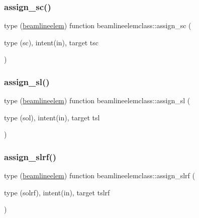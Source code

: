 \mbox{\label{namespacebeamlineelemclass_a1e66e5399a7d4fc6fcfba7e3877f8d2e}} 
\subsubsection{\texorpdfstring{assign\_sc()}{assign\_sc()}}
{\footnotesize\ttfamily type (\mbox{\hyperlink{namespacebeamlineelemclass_structbeamlineelemclass_1_1beamlineelem}{beamlineelem}}) function beamlineelemclass\+::assign\+\_\+sc (\begin{DoxyParamCaption}\item[{type (sc), intent(in), target}]{tsc }\end{DoxyParamCaption})}

\mbox{\label{namespacebeamlineelemclass_ad06dd33f09db1eab5304ec2a865a4b83}} 
\subsubsection{\texorpdfstring{assign\_sl()}{assign\_sl()}}
{\footnotesize\ttfamily type (\mbox{\hyperlink{namespacebeamlineelemclass_structbeamlineelemclass_1_1beamlineelem}{beamlineelem}}) function beamlineelemclass\+::assign\+\_\+sl (\begin{DoxyParamCaption}\item[{type (sol), intent(in), target}]{tsl }\end{DoxyParamCaption})}

\mbox{\label{namespacebeamlineelemclass_a2ab33d7e54bdcb16b1f080eda6e520f2}} 
\subsubsection{\texorpdfstring{assign\_slrf()}{assign\_slrf()}}
{\footnotesize\ttfamily type (\mbox{\hyperlink{namespacebeamlineelemclass_structbeamlineelemclass_1_1beamlineelem}{beamlineelem}}) function beamlineelemclass\+::assign\+\_\+slrf (\begin{DoxyParamCaption}\item[{type (solrf), intent(in), target}]{tslrf }\end{DoxyParamCaption})}

